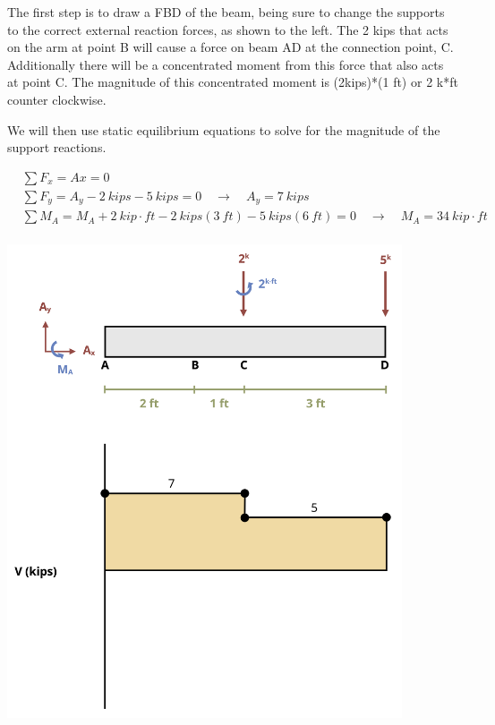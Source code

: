 \documentclass[
  letterpaper,
  DIV=11,
  numbers=noendperiod]{scrreprt}
\begin{document}
\begin{tcolorbox}
\begin{tcolorbox}
The first step is to draw a FBD of the beam, being sure to change the
supports to the correct external reaction forces, as shown to the left.
The 2 kips that acts on the arm at point B will cause a force on beam AD
at the connection point, C. Additionally there will be a concentrated
moment from this force that also acts at point C. The magnitude of this
concentrated moment is (2kips)*(1 ft) or 2 k*ft counter clockwise.

We will then use static equilibrium equations to solve for the magnitude
of the support reactions.

\[
\begin{aligned}
&\sum F_x=A x=0 \\
&\sum F_y=A_y-2{~kips}-5{~kips}=0 \quad\rightarrow\quad A_y=7{~kips} \\
&\sum M_A = M_A + 2{~kip\cdot ft} - 2{~kips}(3{~ft}) - 5{~kips}(6{~ft})=0 \quad\rightarrow\quad M_A=34{~kip\cdot ft} \\
\end{aligned}
\]

\begin{center}
\includegraphics[width=4.59375in,height=\textheight]{images/CH7 PNGs/example 7.4 part 3.png}
\end{center}


\end{tcolorbox}
\end{tcolorbox}
\end{document}
